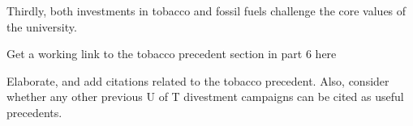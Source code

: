 Thirdly, both investments in tobacco and fossil fuels challenge the core values of the university.



\begin{vcom}
	Get a working link to the tobacco precedent section in part 6 here
\end{vcom}







\begin{vcom}
	Elaborate, and add citations related to the tobacco precedent. Also, consider whether any other previous U of T divestment campaigns can be cited as useful precedents.
\end{vcom}



